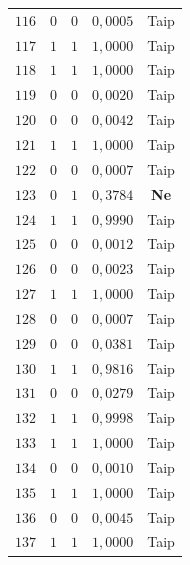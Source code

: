 \begin{longtable}{ccccc}
    $116$ & $0$ & $0$ & $0{,}0005$ & Taip \\
    $117$ & $1$ & $1$ & $1{,}0000$ & Taip \\
    $118$ & $1$ & $1$ & $1{,}0000$ & Taip \\
    $119$ & $0$ & $0$ & $0{,}0020$ & Taip \\
    $120$ & $0$ & $0$ & $0{,}0042$ & Taip \\
    $121$ & $1$ & $1$ & $1{,}0000$ & Taip \\
    $122$ & $0$ & $0$ & $0{,}0007$ & Taip \\
    $123$ & $0$ & $1$ & $0{,}3784$ & \textbf{Ne} \\
    $124$ & $1$ & $1$ & $0{,}9990$ & Taip \\
    $125$ & $0$ & $0$ & $0{,}0012$ & Taip \\
    $126$ & $0$ & $0$ & $0{,}0023$ & Taip \\
    $127$ & $1$ & $1$ & $1{,}0000$ & Taip \\
    $128$ & $0$ & $0$ & $0{,}0007$ & Taip \\
    $129$ & $0$ & $0$ & $0{,}0381$ & Taip \\
    $130$ & $1$ & $1$ & $0{,}9816$ & Taip \\
    $131$ & $0$ & $0$ & $0{,}0279$ & Taip \\
    $132$ & $1$ & $1$ & $0{,}9998$ & Taip \\
    $133$ & $1$ & $1$ & $1{,}0000$ & Taip \\
    $134$ & $0$ & $0$ & $0{,}0010$ & Taip \\
    $135$ & $1$ & $1$ & $1{,}0000$ & Taip \\
    $136$ & $0$ & $0$ & $0{,}0045$ & Taip \\
    $137$ & $1$ & $1$ & $1{,}0000$ & Taip \\
\end{longtable}